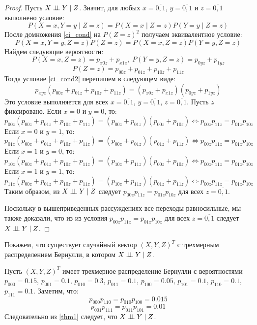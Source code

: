 \begin{proof}
    Пусть $X \perp\!\!\!\perp Y \mid Z$. Значит, для любых $x=\overline{0,1}$, $y=\overline{0,1}$ и $z=\overline{0,1}$ выполнено условие:
    \begin{equation}\label{ci_cond}
        P(X=x, Y=y \mid Z = z) = P(X=x \mid Z = z) P(Y=y \mid Z = z)
    \end{equation}
    После домножения \eqref{ci_cond} на $P(Z=z)^2$ получаем эквивалентное условие:
    \begin{equation}\label{ci_cond2}
        P(X=x,Y=y,Z=z)P(Z=z)=P(X=x,Z=z)P(Y=y,Z=z)
    \end{equation}
    Найдем следующие вероятности:
    $$
        P(X=x, Z=z) = p_{x0z} + p_{x1z},\;  P(Y=y, Z=z) = p_{0yz} + p_{1yz}
    $$
    $$
        P(Z=z)= p_{00z} + p_{01z} + p_{10z} + p_{11z}
    $$
    Тогда условие \eqref{ci_cond2} перепишем в следующем виде:
    $$
        p_{xyz} (p_{00z} + p_{01z} + p_{10z} + p_{11z}) = (p_{x0z} + p_{x1z}) (p_{0yz} + p_{1yz})
    $$
    Это условие выполняется для всех $x=\overline{0,1}$, $y=\overline{0,1}$, $z=\overline{0,1}$.
    Пусть $z$ фиксировано.
    Если $x=0$ и $y=0$, то:
    $$
        p_{00z} (p_{00z} + p_{01z} + p_{10z} + p_{11z}) = (p_{00z} + p_{01z}) (p_{00z} + p_{10z})
    \Leftrightarrow
        p_{00z} p_{11z} = p_{01z} p_{10z}
    $$
    Если $x=0$ и $y=1$, то:
    $$
        p_{01z} (p_{00z} + p_{01z} + p_{10z} + p_{11z}) = (p_{00z} + p_{01z}) (p_{01z} + p_{11z})
    \Leftrightarrow
    p_{00z} p_{11z} = p_{01z} p_{10z}
    $$
    Если $x=1$ и $y=0$, то:
    $$
        p_{10z} (p_{00z} + p_{01z} + p_{10z} + p_{11z}) = (p_{10z} + p_{11z}) (p_{00z} + p_{10z})
    \Leftrightarrow
    p_{00z} p_{11z} = p_{01z} p_{10z}
    $$
    Если $x=1$ и $y=1$, то:
    $$
        p_{11z} (p_{00z} + p_{01z} + p_{10z} + p_{11z}) = (p_{10z} + p_{11z}) (p_{01z} + p_{11z})
    \Leftrightarrow
    p_{00z} p_{11z} = p_{01z} p_{10z}
    $$
    Таким образом, из $X \perp\!\!\!\perp Y \mid Z$ следует
    $p_{00z}p_{11z}=p_{01z}p_{10z}$ для всех $z=\overline{0,1}$.

    Поскольку в вышеприведенных рассуждениях все переходы равносильные,
    мы также доказали, что из из условия $p_{00z}p_{11z}=p_{01z}p_{10z}$ для всех $z=\overline{0,1}$
    следует $X \perp\!\!\!\perp Y \mid Z$.
\end{proof}
Покажем, что существует случайный вектор $(X,Y,Z)^T$ с трехмерным распределением Бернулли, в котором $X \perp\!\!\!\perp Y \mid Z$.
\begin{example}
    Пусть $(X,Y,Z)^T$ имеет трехмерное распределение Бернулли с вероятностями
    $p_{000}=0.15$, $p_{001}=0.1$, $p_{010}=0.3$, $p_{011}=0.1$, $p_{100}=0.05$, $p_{101}=0.1$,
    $p_{110}=0.1$, $p_{111}=0.1$.
    Заметим, что:
    $$p_{000}p_{110}=p_{010}p_{100}=0.015$$ $$p_{001}p_{111}=p_{011}p_{101}=0.01$$
    Следовательно из \autoref{thm1} следует, что $X \perp\!\!\!\perp Y \mid Z$.
\end{example}
